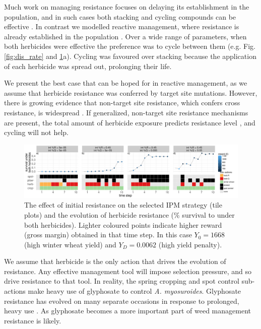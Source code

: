 \documentclass[12pt, a4paper]{article}
\begin{document}
Much work on managing resistance focuses on delaying its establishment in the population, and in such cases both stacking and cycling compounds can be effective \citep{REX2013}. In contrast we modelled reactive management, where resistance is already established in the population \citep{Hick2018}. Over a wide range of parameters, when both herbicides were effective the preference was to cycle between them (e.g. Fig. \ref{fig:dis_rate} and \ref{fig:int_res}a). Cycling was favoured over stacking because the application of each herbicide was spread out, prolonging their life.

We present the best case that can be hoped for in reactive management, as we assume that herbicide resistance was conferred by target site mutations. However, there is growing evidence that non-target site resistance, which confers cross resistance, is widespread \citep{Hick2018}. If generalized, non-target site resistance mechanisms are present, the total amount of herbicide exposure predicts resistance level \citep{Hick2018}, and cycling will not help.
\begin{figure}[!ht]
	\includegraphics[width=178mm]{MS_figs/int_res_strat_resist.pdf}
	\caption{The effect of initial resistance on the selected IPM strategy (tile plots) and the evolution of herbicide resistance (\% survival to under both herbicides). Lighter coloured points indicate higher reward (gross margin) obtained in that time step. In this case $Y_0 = 1668$ (high winter wheat yield) and $Y_D = 0.0062$ (high yield penalty).}
	\label{fig:int_res} 
\end{figure}

We assume that herbicide is the only action that drives the evolution of resistance. Any effective management tool will impose selection pressure, and so drive resistance to that tool. In reality, the spring cropping and spot control sub-actions make heavy use of glyphosate to control \textit{A. myosuroides}. Glyphosate resistance has evolved on many separate occasions in response to prolonged, heavy use \citep{Samm2014}. As glyphosate becomes a more important part of weed management \citep{Hick2018} resistance is likely. 
\end{document}
